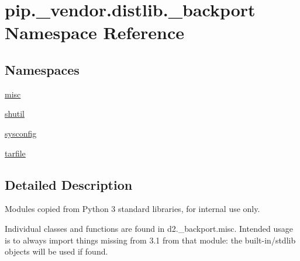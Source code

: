 \hypertarget{namespacepip_1_1__vendor_1_1distlib_1_1__backport}{}\section{pip.\+\_\+vendor.\+distlib.\+\_\+backport Namespace Reference}
\label{namespacepip_1_1__vendor_1_1distlib_1_1__backport}
\subsection*{Namespaces}
\begin{DoxyCompactItemize}
\item 
 \hyperlink{namespacepip_1_1__vendor_1_1distlib_1_1__backport_1_1misc}{misc}
\item 
 \hyperlink{namespacepip_1_1__vendor_1_1distlib_1_1__backport_1_1shutil}{shutil}
\item 
 \hyperlink{namespacepip_1_1__vendor_1_1distlib_1_1__backport_1_1sysconfig}{sysconfig}
\item 
 \hyperlink{namespacepip_1_1__vendor_1_1distlib_1_1__backport_1_1tarfile}{tarfile}
\end{DoxyCompactItemize}


\subsection{Detailed Description}
\begin{DoxyVerb}Modules copied from Python 3 standard libraries, for internal use only.

Individual classes and functions are found in d2._backport.misc.  Intended
usage is to always import things missing from 3.1 from that module: the
built-in/stdlib objects will be used if found.
\end{DoxyVerb}
 